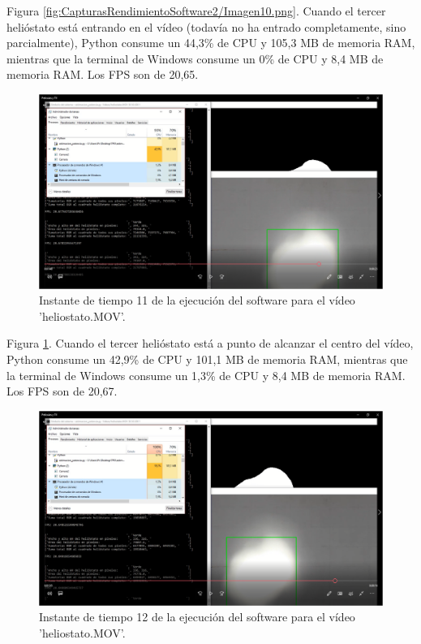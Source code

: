 Figura \ref{fig:CapturasRendimientoSoftware2/Imagen10.png}. Cuando el tercer helióstato está entrando en el vídeo (todavía no ha entrado completamente, sino parcialmente), Python consume un 44,3\% de CPU y 105,3 MB de memoria RAM, mientras que la terminal de Windows consume un 0\% de CPU y 8,4 MB de memoria RAM. Los FPS son de 20,65.

\begin{figure}[h!]
  	\centering
	\includegraphics[width=\textwidth]{CapturasRendimientoSoftware2/Imagen11.png}
	\caption{Instante de tiempo 11 de la ejecución del software para el vídeo 'heliostato.MOV'.
	\label{fig:CapturasRendimientoSoftware2/Imagen11.png}}
\end{figure}

Figura \ref{fig:CapturasRendimientoSoftware2/Imagen11.png}. Cuando el tercer helióstato está a punto de alcanzar el centro del vídeo, Python consume un 42,9\% de CPU y 101,1 MB de memoria RAM, mientras que la terminal de Windows consume un 1,3\% de CPU y 8,4 MB de memoria RAM. Los FPS son de 20,67.

\begin{figure}[h!]
  	\centering
	\includegraphics[width=\textwidth]{CapturasRendimientoSoftware2/Imagen12.png}
	\caption{Instante de tiempo 12 de la ejecución del software para el vídeo 'heliostato.MOV'.
	\label{fig:CapturasRendimientoSoftware2/Imagen12.png}}
\end{figure}

